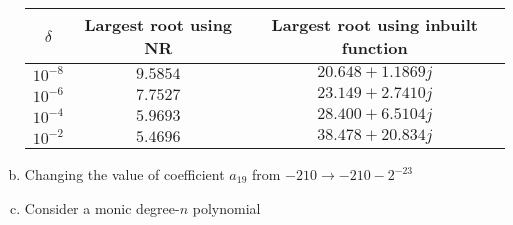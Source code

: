 \begin{enumerate}[(a)]
\begin{table}[H]
\begin{tabular}{c|c|c}
				$\delta$ 	& Largest root using NR & Largest root using inbuilt function \\
				\hline
				$10^{-8}$	& $9.5854$ 	& 	$20.648+1.1869j$\\
				$10^{-6}$	& $7.7527$	&	$23.149 +2.7410j$\\
				$10^{-4}$	& $5.9693$	&	$28.400 +6.5104j$\\
				$10^{-2}$	& $5.4696$	&	$38.478 +20.834j$
			\end{tabular}
		\end{table}
	\item Changing the value of coefficient $a_{19}$ from $-210 \rightarrow -210-2^{-23}$
	\item Consider a monic degree-$n$ polynomial
\end{enumerate}
